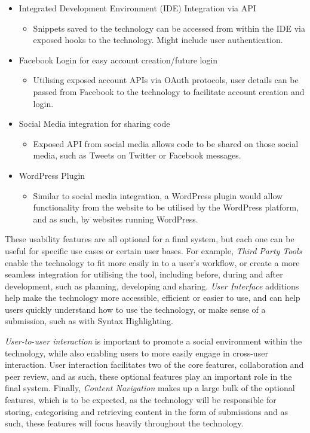 \begin{itemize}
	\begin{itemize} 
		\item Integrated Development Environment (IDE) Integration via API
		\begin{itemize}
			\item Snippets saved to the technology can be accessed from within the IDE via exposed hooks to the technology.
Might include user authentication.
		\end{itemize}
		\item Facebook Login for easy account creation/future login
		\begin{itemize}
			\item Utilising exposed account APIs via OAuth protocols, user details can be passed from Facebook to the technology to facilitate account creation and login.
		\end{itemize}
		\item Social Media integration for sharing code
		\begin{itemize}
			\item Exposed API from social media allows code to be shared on those social media, such as Tweets on Twitter or Facebook messages.
		\end{itemize}
		\item WordPress Plugin
		\begin{itemize}
			\item Similar to social media integration, a WordPress plugin would allow functionality from the website to be utilised by the WordPress platform, and as such, by websites running WordPress.
		\end{itemize}
	\end{itemize}
\end{itemize}

These usability features are all optional for a final system, but each one can be useful for specific use cases or certain user bases.
For example, \textit{Third Party Tools} enable the technology to fit more easily in to a user's workflow, or create a more seamless integration for utilising the tool, including before, during and after development, such as planning, developing and sharing.
\textit{User Interface} additions help make the technology more accessible, efficient or easier to use, and can help users quickly understand how to use the technology, or make sense of a submission, such as with Syntax Highlighting.

\textit{User-to-user interaction} is important to promote a social environment within the technology, while also enabling users to more easily engage in cross-user interaction.
User interaction facilitates two of the core features, collaboration and peer review, and as such, these optional features play an important role in the final system.
Finally, \textit{Content Navigation} makes up a large bulk of the optional features, which is to be expected, as the technology will be responsible for storing, categorising and retrieving content in the form of submissions and as such, these features will focus heavily throughout the technology.

